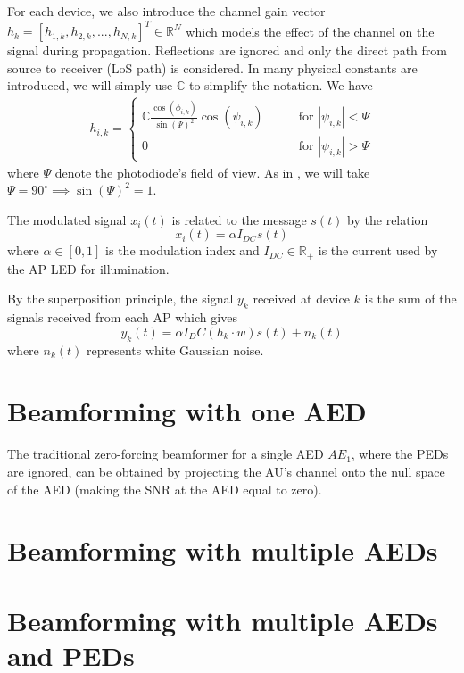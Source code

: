 \documentclass[a4paper,12pt,twoside]{article}
\begin{document}
	For each device, we also introduce the channel gain vector $h_k = [h_{1,k}, h_{2,k}, ... , h_{N,k}]^T \in \mathbb{R}^N$ which models the effect of the channel on the signal during propagation. Reflections are ignored and only the direct path from source to receiver (LoS path) is considered. In \cite{Oxford2021} many physical constants are introduced, we will simply use $\mathbb{C}$ to simplify the notation. We have
	\begin{align}
		h_{i,k} =
		\begin{cases}
			\mathbb{C}\frac{\cos(\phi_{i,k})}{\sin(\Psi)^2}\cos(\psi_{i,k}) \qquad &\text{for $|\psi_{i,k}| < \Psi$} \\
			0 \qquad &\text{for $|\psi_{i,k}| > \Psi$}
		\end{cases} 
	\end{align}
	where $\Psi$ denote the photodiode's field of view. As in \cite{Oxford2021}, we will take $\Psi = 90^\circ \implies \sin(\Psi)^2 = 1$.
	
	The modulated signal $x_i(t)$ is related to the message $s(t)$ by the relation
	\begin{equation}
		x_i(t) = \alpha I_{DC} s(t)
	\end{equation}
	where $\alpha \in [0, 1]$ is the modulation index and $I_{DC} \in \mathbb{R}_+$ is the current used by the AP LED for illumination. 
	
	By the superposition principle, the signal $y_k$ received at device $k$ is the sum of the signals received from each AP which gives
	\begin{equation}
		y_k(t) = \alpha I_DC (h_k \cdot w) s(t) + n_k(t)
	\end{equation}
	where $n_k(t)$ represents white Gaussian noise.
	
	\section{Beamforming with one AED}
	
	The traditional zero-forcing beamformer for a single AED $AE_1$, where the PEDs are ignored, can be obtained by projecting the AU's channel onto the null space of the AED (making the SNR at the AED equal to zero).
	
	\section{Beamforming with multiple AEDs}
	
	
	\section{Beamforming with multiple AEDs and PEDs}
	
\end{document}
